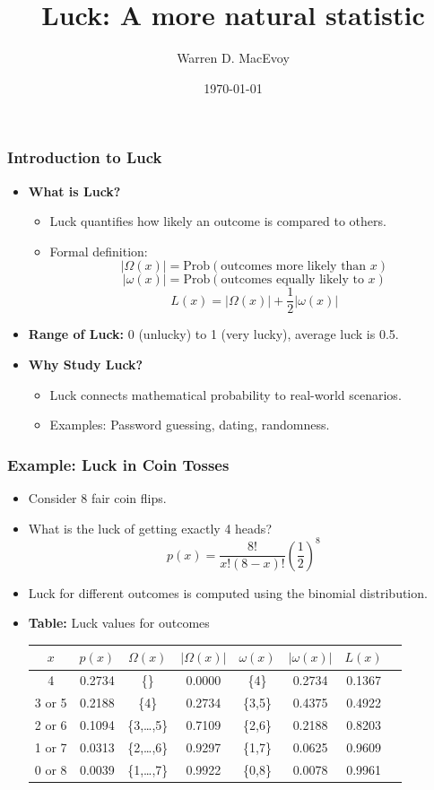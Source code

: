 \documentclass{beamer}
\title{Luck: A more natural statistic}
\author{Warren D. MacEvoy}
\date{\today}
\begin{document}
\frame{\titlepage}

\begin{frame}
\frametitle{Introduction to Luck}
\begin{itemize}
    \item \textbf{What is Luck?}
        \begin{itemize}
            \item Luck quantifies how likely an outcome is compared to others.
            \item Formal definition:
              \[|\Omega(x)| = \text{Prob}(\text{outcomes more likely than $x$})\]
              \[|\omega(x)| = \text{Prob}(\text{outcomes equally likely to $x$})\]
            \[L(x) = |\Omega(x)| + \frac{1}{2}|\omega(x)|\]
        \end{itemize}
    \item \textbf{Range of Luck:} 0 (unlucky) to 1 (very lucky), average luck is 0.5.
    \item \textbf{Why Study Luck?}
        \begin{itemize}
            \item Luck connects mathematical probability to real-world scenarios.
            \item Examples: Password guessing, dating, randomness.
        \end{itemize}
\end{itemize}
\end{frame}

\begin{frame}
\frametitle{Example: Luck in Coin Tosses}
\begin{itemize}
    \item Consider 8 fair coin flips.
    \item What is the luck of getting exactly 4 heads?
    \[
    p(x) = \frac{8!}{x!(8-x)!} \left( \frac{1}{2} \right)^8
    \]
    \item Luck for different outcomes is computed using the binomial distribution.
    \item \textbf{Table:} Luck values for outcomes
    \begin{center}
    \begin{tabular}{|c|c|c|c|c|c|c|c|}
    \hline
    $x$ & $p(x)$ & $\Omega(x)$ & $|\Omega(x)|$ & $\omega(x)$ & $|\omega(x)|$ & $L(x)$ \\
    \hline
     4 & 0.2734 &  \{\} & 0.0000 & \{4\} & 0.2734 & 0.1367 \\
3 or 5 & 0.2188 & \{4\} & 0.2734 & \{3,5\} & 0.4375 & 0.4922 \\
2 or 6 & 0.1094 & \{3,\ldots,5\} & 0.7109 & \{2,6\} & 0.2188 & 0.8203 \\
1 or 7 & 0.0313 & \{2,\ldots,6\} & 0.9297 & \{1,7\} & 0.0625 & 0.9609 \\
0 or 8 & 0.0039 & \{1,\ldots,7\} & 0.9922 & \{0,8\} & 0.0078 & 0.9961 \\
    \hline
    \end{tabular}
    \end{center}
\end{itemize}
\end{frame}
\end{document}
